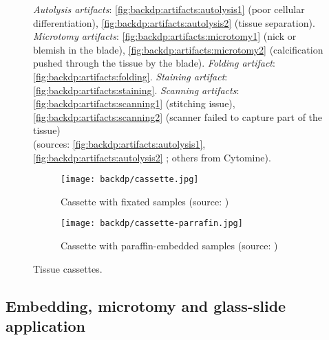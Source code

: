 \begin{figure}
  \caption{\textit{Autolysis artifacts}: \ref{fig:backdp:artifacts:autolysis1} (poor cellular differentiation), \ref{fig:backdp:artifacts:autolysis2} (tissue separation). \textit{Microtomy artifacts}: \ref{fig:backdp:artifacts:microtomy1} (nick or blemish in the blade), \ref{fig:backdp:artifacts:microtomy2} (calcification pushed through the tissue by the blade). \textit{Folding artifact}: \ref{fig:backdp:artifacts:folding}. \textit{Staining artifact}: \ref{fig:backdp:artifacts:staining}. \textit{Scanning artifacts}: \ref{fig:backdp:artifacts:scanning1} (stitching issue), \ref{fig:backdp:artifacts:scanning2} (scanner failed to capture part of the tissue) \\ (sources: \ref{fig:backdp:artifacts:autolysis1}, \ref{fig:backdp:artifacts:autolysis2} \cite{taqi2018review}; others from Cytomine).}
  \label{fig:backdp:artifacts:all}
\end{figure}

\begin{figure}
  \centering
  \begin{subfigure}[t]{0.48\textwidth}
    \centering
    \texttt{[image: backdp/cassette.jpg]}
    \caption{Cassette with fixated samples (source: \cite{stidworthy2011getting})}
    \label{fig:backdp:cassette}
  \end{subfigure}\quad
  \begin{subfigure}[t]{0.48\textwidth}
    \centering
    \texttt{[image: backdp/cassette-parrafin.jpg]}
    \caption{Cassette with paraffin-embedded samples (source: \cite{img:cassetteparrafin})}
    \label{fig:backdp:cassette-paraffin}
  \end{subfigure}
  \caption{Tissue cassettes.}
\end{figure}

\subsection{Embedding, microtomy and glass-slide application}
\label{ssec:backdp:embedding}

